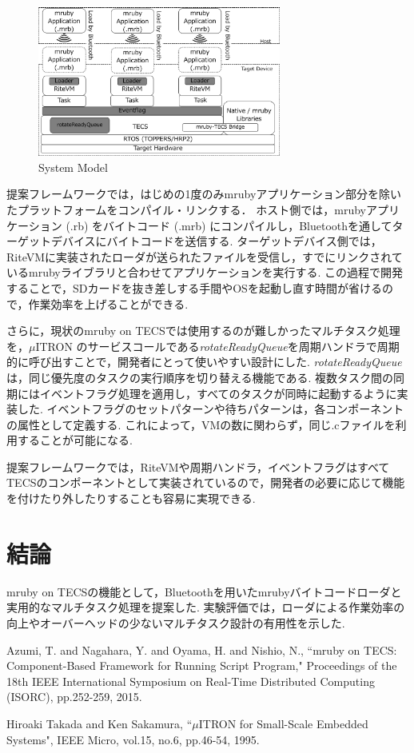 \documentclass[a4j,10pt,twocolumn]{utf8/abstract}
\begin{document}
\begin{figure}[h]
    \centering
    \includegraphics[width=8cm,clip]{figure/system_model.pdf}
    \caption{System Model}
    \label{fig:system_model}
\end{figure}

提案フレームワークでは，はじめの1度のみmrubyアプリケーション部分を除いたプラットフォームをコンパイル・リンクする．
ホスト側では，mrubyアプリケーション (.rb) をバイトコード (.mrb) にコンパイルし，Bluetoothを通してターゲットデバイスにバイトコードを送信する.
ターゲットデバイス側では，RiteVMに実装されたローダが送られたファイルを受信し，すでにリンクされているmrubyライブラリと合わせてアプリケーションを実行する.
この過程で開発することで，SDカードを抜き差しする手間やOSを起動し直す時間が省けるので，作業効率を上げることができる.

さらに，現状のmruby on TECSでは使用するのが難しかったマルチタスク処理を，$\mu$ITRON \cite{microITRON} のサービスコールである{\it rotateReadyQueue}を周期ハンドラで周期的に呼び出すことで，開発者にとって使いやすい設計にした.
{\it rotateReadyQueue}は，同じ優先度のタスクの実行順序を切り替える機能である.
複数タスク間の同期にはイベントフラグ処理を適用し，すべてのタスクが同時に起動するように実装した.
イベントフラグのセットパターンや待ちパターンは，各コンポーネントの属性として定義する.
これによって，VMの数に関わらず，同じ.cファイルを利用することが可能になる.

提案フレームワークでは，RiteVMや周期ハンドラ，イベントフラグはすべてTECSのコンポーネントとして実装されているので，開発者の必要に応じて機能を付けたり外したりすることも容易に実現できる.

\section{結論}
mruby on TECSの機能として，Bluetoothを用いたmrubyバイトコードローダと実用的なマルチタスク処理を提案した.
実験評価では，ローダによる作業効率の向上やオーバーヘッドの少ないマルチタスク設計の有用性を示した.


%
%
\begin{thebibliography}{2}
 Azumi, T. and Nagahara, Y. and Oyama, H. and Nishio, N., 
    ``mruby on TECS: Component-Based Framework for Running Script Program," 
    Proceedings of the 18th IEEE International Symposium on Real-Time Distributed Computing (ISORC), 
    pp.252-259, 
    2015. 

     Hiroaki Takada and Ken Sakamura,
    ``$\mu$ITRON for Small-Scale Embedded Systems",
    IEEE Micro,
    vol.15,
    no.6,
    pp.46-54,
    1995.
\end{thebibliography}
\newpage
\pagebreak
\end{document}
